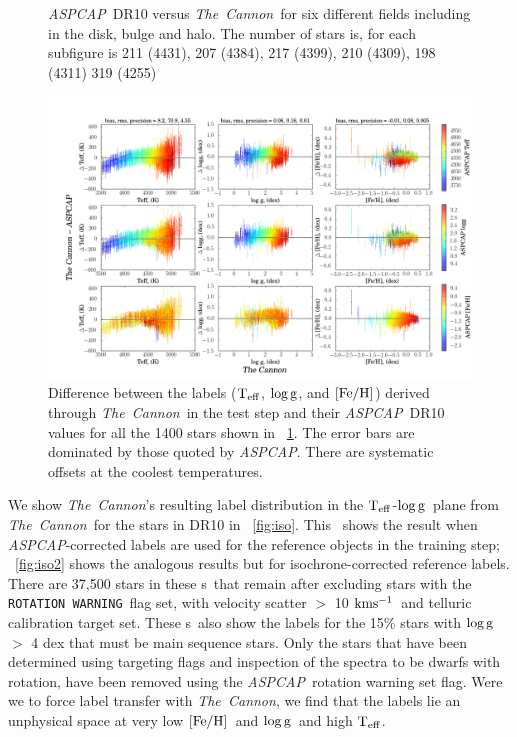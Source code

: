 \documentclass[12pt, preprint]{aastex}
\newcommand{\figurenames}{\figurename s}
\newcommand{\tc}{\textsl{The~Cannon}}
\newcommand{\aspcap}{\textsl{ASPCAP}}
\newcommand{\rotwarn}{\texttt{ROTATION WARNING}}
\newcommand{\teff}{\mbox{$\rm T_{eff}$}}
\newcommand{\kms}{\mbox{$\rm kms^{-1}$}}
\newcommand{\feh}{\mbox{$\rm [Fe/H]$}}
\newcommand{\logg}{\mbox{$\rm \log g$}}
\begin{document}
\begin{figure}[!h]
\caption{\small{\aspcap\ DR10 versus \tc\ for six different fields including in the disk, bulge and halo. The number of stars is, for each subfigure is 211 (4431), 207 (4384), 217 (4399), 210 (4309), 198 (4311) 319 (4255) }}
\label{fig:cal}
\end{figure}

\begin{figure}[!h]
\centering
        \includegraphics[scale=0.35]{./plots/cplot2.png} 
\caption{Difference between the labels (\teff, \logg, and \feh) derived through \tc\ in the test step and their \aspcap\ DR10 values for all the 1400 stars shown in \figurename~\ref{fig:cal}. The error bars are dominated by those quoted by \aspcap. There are systematic offsets at the coolest temperatures.}
\label{fig:cplot}
\end{figure}


We show \tc 's resulting label distribution in the \teff-\logg\ plane from \tc\ for the stars in DR10 in \figurename~\ref{fig:iso}. 
This \figurename\ shows the result when \aspcap -corrected labels are used for the reference objects in the training step; \figurename~\ref{fig:iso2} shows the analogous results but for isochrone-corrected reference labels. There are 37,500 stars in these \figurenames\ that remain after excluding stars with the \rotwarn\ flag set, with velocity scatter $>$ 10 \kms\ and telluric calibration target set. These \figurenames\ also show the labels for the 15\% stars with \logg $>$ 4 dex that must be main sequence stars.
 Only the stars that have been determined using targeting flags and inspection of the spectra to be dwarfs with rotation, 
 have been removed using the \aspcap\ rotation warning set flag. 
 Were we to force label transfer with \tc , we find that the labels lie an unphysical space at very low \feh\ and \logg\ and high \teff.
\end{document}
